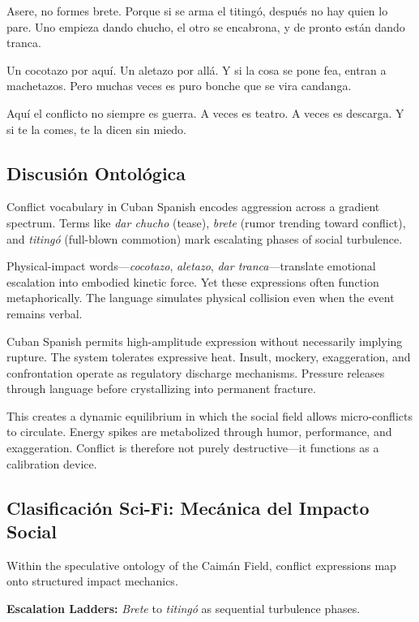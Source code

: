 \documentclass[12pt]{article}
\begin{document}
Asere, no formes brete. Porque si se arma el titingó, después no hay quien lo pare. Uno empieza dando chucho, el otro se encabrona, y de pronto están dando tranca.

Un cocotazo por aquí. Un aletazo por allá. Y si la cosa se pone fea, entran a machetazos. Pero muchas veces es puro bonche que se vira candanga.

Aquí el conflicto no siempre es guerra. A veces es teatro. A veces es descarga. Y si te la comes, te la dicen sin miedo.

\subsection*{Discusión Ontológica}

Conflict vocabulary in Cuban Spanish encodes aggression across a gradient spectrum. Terms like \textit{dar chucho} (tease), \textit{brete} (rumor trending toward conflict), and \textit{titingó} (full-blown commotion) mark escalating phases of social turbulence.

Physical-impact words---\textit{cocotazo}, \textit{aletazo}, \textit{dar tranca}---translate emotional escalation into embodied kinetic force. Yet these expressions often function metaphorically. The language simulates physical collision even when the event remains verbal.

Cuban Spanish permits high-amplitude expression without necessarily implying rupture. The system tolerates expressive heat. Insult, mockery, exaggeration, and confrontation operate as regulatory discharge mechanisms. Pressure releases through language before crystallizing into permanent fracture.

This creates a dynamic equilibrium in which the social field allows micro-conflicts to circulate. Energy spikes are metabolized through humor, performance, and exaggeration. Conflict is therefore not purely destructive---it functions as a calibration device.

\subsection*{Clasificación Sci-Fi: Mecánica del Impacto Social}

Within the speculative ontology of the Caimán Field, conflict expressions map onto structured impact mechanics.

\textbf{Escalation Ladders:} \textit{Brete} to \textit{titingó} as sequential turbulence phases.
\end{document}
